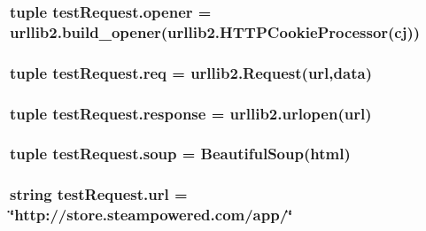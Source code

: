 \hypertarget{namespacetest_request_a32d478514621667126784650159375ae}{
\subsubsection[{opener}]{\setlength{\rightskip}{0pt plus 5cm}tuple test\+Request.\+opener = urllib2.\+build\+\_\+opener(urllib2.\+H\+T\+T\+P\+Cookie\+Processor({\bf cj}))}}\label{namespacetest_request_a32d478514621667126784650159375ae}
\hypertarget{namespacetest_request_a5db18cf7ac0523c1940da68f3301fc49}{
\subsubsection[{req}]{\setlength{\rightskip}{0pt plus 5cm}tuple test\+Request.\+req = urllib2.\+Request({\bf url},{\bf data})}}\label{namespacetest_request_a5db18cf7ac0523c1940da68f3301fc49}
\hypertarget{namespacetest_request_a82a62563089eee6f274889ef4cda4c83}{
\subsubsection[{response}]{\setlength{\rightskip}{0pt plus 5cm}tuple test\+Request.\+response = urllib2.\+urlopen({\bf url})}}\label{namespacetest_request_a82a62563089eee6f274889ef4cda4c83}
\hypertarget{namespacetest_request_abdcf7c50bc605e36463827591ea27597}{
\subsubsection[{soup}]{\setlength{\rightskip}{0pt plus 5cm}tuple test\+Request.\+soup = Beautiful\+Soup({\bf html})}}\label{namespacetest_request_abdcf7c50bc605e36463827591ea27597}
\hypertarget{namespacetest_request_a503c8624234f46b468f9d0b807d63cb0}{
\subsubsection[{url}]{\setlength{\rightskip}{0pt plus 5cm}string test\+Request.\+url = \char`\"{}http\+://store.\+steampowered.\+com/app/\char`\"{}}}\label{namespacetest_request_a503c8624234f46b468f9d0b807d63cb0}
